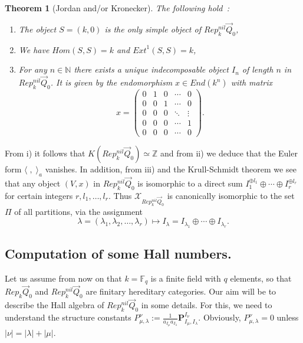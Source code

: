 \documentclass[a4paper,10pt]{amsart}
\def\Z{\mathbb{Z}}
\def\N{\mathbb{N}}
\newtheorem{theo}{\bf{Theorem}}[section]
\numberwithin{equation}{section}
\begin{document}
\begin{theo}[Jordan and/or Kronecker]\label{T:Jordan} The following hold~:
\begin{enumerate}
\item[i)] The object $S=(k,0)$ is the only simple object of $Rep^{nil}_k\vec{Q}_0$,
\item[ii)] We have ${Hom}(S,S)=k$ and ${Ext}^1(S,S)=k$,
\item[iii)] For any $n \in \N$ there exists a unique indecomposable object $I_n$ of length $n$ in $Rep^{nil}_k\vec{Q}_0$. It is given by the endomorphism $x \in {End}(k^n)$ with matrix
$$x=\begin{pmatrix} 0 & 1 & 0 & \cdots & 0\\ 0 & 0 & 1 & \cdots & 0\\ 0 & 0 & 0 & \ddots & \vdots\\ 0 & 0 & 0 & \cdots & 1\\ 0 & 0 & 0 & \cdots & 0 \end{pmatrix}.$$
\end{enumerate}
\end{theo}

\vspace{.15in}

From i) it follows that $K(Rep^{nil}_k\vec{Q}_0) \simeq \Z$ and from ii) we deduce that the Euler form $\langle\;,\;\rangle_a$ vanishes. In addition, from iii) and the Krull-Schmidt theorem we see that any object $(V,x)$ in $Rep^{nil}_k\vec{Q}_0$ is isomorphic to a direct sum $I_1^{\oplus l_1} \oplus \cdots \oplus I_r^{\oplus l_r}$ for certain integers $r, l_1, \ldots, l_r$. Thus $\mathcal{X}_{Rep^{nil}_k\vec{Q}_0}$ is canonically isomorphic to the set $\Pi$ of all partitions, via the assignment
$${\lambda}=(\lambda_1, \lambda_2, \ldots, \lambda_r) \mapsto I_{\lambda}=I_{\lambda_1} \oplus \cdots \oplus I_{\lambda_r}.$$

\vspace{.2in}

\subsection{Computation of some Hall numbers.}

\vspace{.15in}

Let us assume from now on that $k=\mathbb{F}_q$ is a finite field with $q$ elements, so that $Rep_k\vec{Q}_0$ and $Rep^{nil}_k\vec{Q}_0$ are finitary hereditary categories. Our aim will be to describe the Hall algebra of $Rep^{nil}_k\vec{Q}_0$ in some details. For this, we need to understand the structure constants $P^{\nu}_{\mu,\lambda}:=\frac{1}{a_{I_{\mu}}a_{I_{\lambda}}}\mathbf{P}_{I_{\mu},I_{\lambda}}^{I_{\nu}}$. Obviously, $P^{\nu}_{\mu,\lambda}=0$ unless $|\nu|=|\lambda|+|\mu|$.
\end{document}
